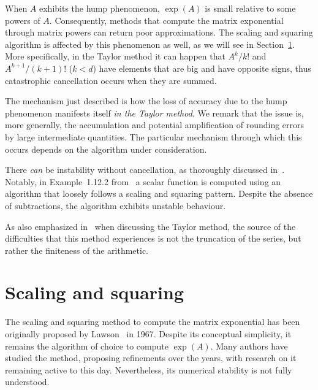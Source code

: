 When $A$ exhibits the hump phenomenon, $\exp(A)$ is small relative to some powers of $A$. Consequently, methods that compute the matrix exponential through matrix powers can return poor approximations. The scaling and squaring algorithm is affected by this phenomenon as well, as we will see in Section~\ref{subs:scaling_and_squaring}. 
More specifically, in the Taylor method it can happen that $A^k/k!$ and $A^{k+1}/(k+1)!$ ($k<d$) have elements that are big and have opposite signs, thus catastrophic cancellation occurs when they are summed.

\begin{oss*}
	The mechanism just described is how the loss of accuracy due to the hump phenomenon manifests itself \emph{in the Taylor method}. We remark that the issue is, more generally, the accumulation and potential amplification of rounding errors by large intermediate quantities. The particular mechanism through which this occurs depends on the algorithm under consideration.
	
	There \emph{can} be instability without cancellation, as thoroughly discussed in~\cite[§~1.12]{higham:accuracy_book}. Notably, in Example~1.12.2 from~\cite[§~1.12]{higham:accuracy_book} a scalar function is computed using an algorithm that loosely follows a scaling and squaring pattern. Despite the absence of subtractions, the algorithm exhibits unstable behaviour.
\end{oss*}

\begin{oss*}
	As also emphasized in~\cite{moler_vanloan:19_dubious_ways, moler_vanloan:19_dubious_ways_25yrs} when discussing the Taylor method, the source of the difficulties that this method experiences is not the truncation of the series, but rather the finiteness of the arithmetic.
\end{oss*}


\section{Scaling and squaring}\label{subs:scaling_and_squaring}
The scaling and squaring method to compute the matrix exponential has been originally proposed by Lawson~\cite{lawson:sas_original} in 1967. Despite its conceptual simplicity, it remains the algorithm of choice to compute $\exp(A)$. 
Many authors have studied the method, proposing refinements over the years, with research on it remaining active to this day. Nevertheless, its numerical stability is not fully understood.

